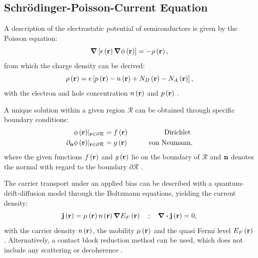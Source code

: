 \subsection{Schrödinger-Poisson-Current Equation} \label{ssec:schrödinger-current-poisson-equation}
A description of the electrostatic potential of semiconductors is given by the Poisson equation:
\begin{equation}
  \grad\left[\epsilon\left(\vb{r}\right)\grad \phi \left(\vb{r}\right)\right] = -\rho\left(\vb{r}\right),
\end{equation}
from which the charge density can be derived:
\begin{equation}
  \rho\left(\vb{r}\right) = e \left[p\left(\vb{r}\right) - n\left(\vb{r}\right) + N_D\left(\vb{r}\right) - N_A\left(\vb{r}\right)\right],
\end{equation}
with the electron and hole concentration $n\left(\vb{r}\right)$ and $p\left(\vb{r}\right)$ \cite{Li2004,Birner2006}.

A unique solution within a given region $\mathcal{R}$ can be obtained through specific boundary conditions:
\begin{alignat}{3}
  \phi\left(\vb{r}\right) \rvert_{\vb{r} \in \partial \mathcal{R}} &= f\left(\vb{r}\right) &\qquad\text{Dirichlet}&\\
  \partial_{\vb{n}}\phi\left(\vb{r}\right)\rvert_{\vb{r} \in \partial \mathcal{R}} &= g\left(\vb{r}\right) &\qquad\text{von Neumann}&,
\end{alignat}
where the given functions $f\left(\vb{r}\right)$ and $g\left(\vb{r}\right)$ lie on the boundary of $\mathcal{R}$ and $\vb{n}$ denotes the normal with regard to the boundary $\partial \mathcal{R}$ \cite*{Jomaa2005,Ma2013}.

The carrier transport under an applied bias can be described with a quantum-drift-diffusion model through the Boltzmann equations, yielding the current density:
\begin{equation}
  \vb{j}\left(\vb{r}\right) = \mu\left(\vb{r}\right) n\left(\vb{r}\right) \grad E_F\left(\vb{r}\right) \quad ; \quad \div \vb{j}\left(\vb{r}\right) = 0,
\end{equation}
with the carrier density $n\left(\vb{r}\right)$, the mobility $\mu\left(\vb{r}\right)$ and the quasi Fermi level $E_F\left(\vb{r}\right)$ \cite{Sabathil2002,Birner2007}. Alternatively, a contact block reduction method can be used, which does not include any scattering or decoherence \cite{Mamaluy2003,Mamaluy2005}.
